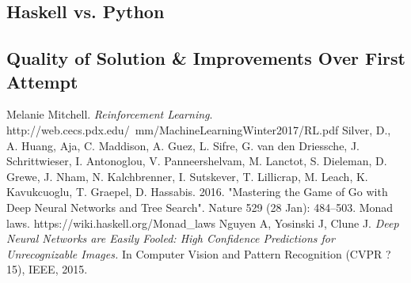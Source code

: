 \documentclass[12pt,a4paper]{article}
\begin{document}
		\subsection{Haskell vs. Python}
		
		\subsection{Quality of Solution \& Improvements Over First Attempt}

	\pagebreak
	\begin{thebibliography}{9}
		Melanie  Mitchell.
		\textit{Reinforcement Learning}.
		http://web.cecs.pdx.edu/~mm/MachineLearningWinter2017/RL.pdf
		Silver, D., A. Huang, Aja, C. Maddison, A. Guez, L. Sifre, G. van den Driessche, J. Schrittwieser, I. Antonoglou, V. Panneershelvam, M. Lanctot, S. Dieleman, D. Grewe, J. Nham, N. Kalchbrenner, I. Sutskever, T. Lillicrap, M. Leach, K. Kavukcuoglu, T. Graepel, D. Hassabis. 2016. "Mastering the Game of Go with Deep Neural Networks and Tree Search". Nature 529 (28 Jan): 484--503.
		Monad laws.
		https://wiki.haskell.org/Monad\_laws
		Nguyen A, Yosinski J, Clune J. 
		\textit{Deep Neural Networks are Easily Fooled: High Confidence Predictions
for Unrecognizable Images.}
		In Computer Vision and Pattern Recognition (CVPR ?15), IEEE, 2015.
	\end{thebibliography}
	
	
            
            
\end{document}
